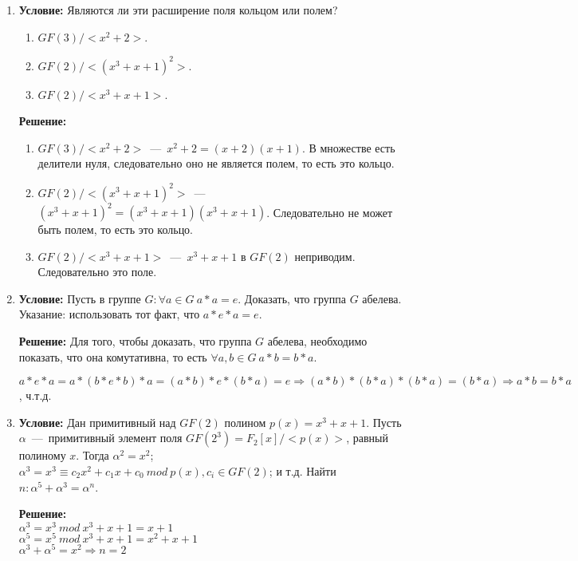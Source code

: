 \documentclass[12pt,a4paper,oneside]{extarticle}
\begin{document}
\begin{enumerate}
    \item {\bf Условие:}  Являются ли эти расширение поля кольцом или полем? 
    \begin{enumerate}
        \item $GF(3)/ < x^2+2 >$.
        \item $GF(2)/ < (x^3+x+1)^2 >$.
        \item $GF(2)/ < x^3+x+1 >$.
    \end{enumerate}

        {\bf Решение:}

        \begin{enumerate}
            \item $GF(3)/ < x^2+2 >$~---~$x^2+2=(x+2)(x+1)$. В множестве есть делители нуля, следовательно оно не является полем, то есть это кольцо.
            \item $GF(2)/ < (x^3+x+1)^2 >$~---~$(x^3+x+1)^2=(x^3+x+1)(x^3+x+1)$. Следовательно не может быть полем, то есть это кольцо.
            \item $GF(2)/ < x^3+x+1 >$~---~$x^3+x+1$ в $GF(2)$ неприводим. Следовательно это поле.
        \end{enumerate}
    \item {\bf Условие:}  Пусть в группе $G \colon \forall a \in G~a*a=e$. Доказать, что группа $G$ абелева. Указание: использовать тот факт, что $a * e * a = e$.

        {\bf Решение:} Для того, чтобы доказать, что группа $G$ абелева, необходимо показать, что она комутативна, то есть $\forall a,b \in G~ a*b=b*a$.

        $a*e*a = a*(b*e*b)*a = (a*b) * e * (b*a) = e \Rightarrow (a*b)*(b*a)*(b*a)=(b*a) \Rightarrow a*b=b*a$, ч.т.д.


    \item {\bf Условие:} Дан примитивный над $GF(2)$ полином $p(x) = x^3 + x + 1$. Пусть $\alpha$~---~примитивный элемент поля $GF(2^3) = F_2[x]/ < p(x) >$, равный полиному $x$. Тогда $\alpha^2=x^2$; $\alpha^3 = x^3 \equiv c_2x^2+c_1x+c_0 ~mod~ p(x), c_i \in GF(2)$; и т.д. Найти $n \colon \alpha^5+\alpha^3=\alpha^n$.

        {\bf Решение:}\\
        $\alpha^3 = x^3 ~mod~ x^3+x+1 = x+1$ \\
        $\alpha^5 = x^5 ~mod~ x^3+x+1 = x^2+x+1$ \\
        $\alpha^3 + \alpha^5 = x^2 \Rightarrow n=2$


\end{enumerate}
\end{document}
